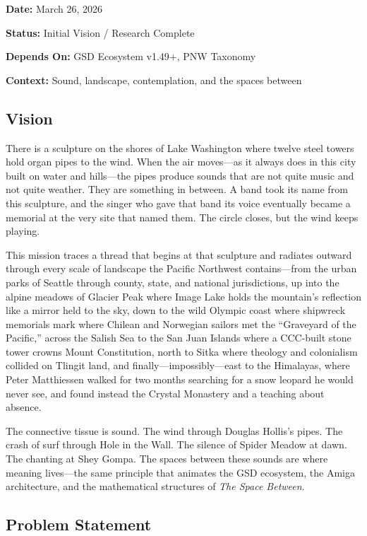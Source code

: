 \documentclass[11pt,letterpaper]{article}
\newcommand{\metafield}[2]{\textbf{\sffamily #1} #2\par}
\begin{document}
\metafield{Date:}{March 26, 2026}
\metafield{Status:}{Initial Vision / Research Complete}
\metafield{Depends On:}{GSD Ecosystem v1.49+, PNW Taxonomy}
\metafield{Context:}{Sound, landscape, contemplation, and the spaces between}

\subsection{Vision}

There is a sculpture on the shores of Lake Washington where twelve steel towers hold organ pipes to the wind. When the air moves---as it always does in this city built on water and hills---the pipes produce sounds that are not quite music and not quite weather. They are something in between. A band took its name from this sculpture, and the singer who gave that band its voice eventually became a memorial at the very site that named them. The circle closes, but the wind keeps playing.

This mission traces a thread that begins at that sculpture and radiates outward through every scale of landscape the Pacific Northwest contains---from the urban parks of Seattle through county, state, and national jurisdictions, up into the alpine meadows of Glacier Peak where Image Lake holds the mountain's reflection like a mirror held to the sky, down to the wild Olympic coast where shipwreck memorials mark where Chilean and Norwegian sailors met the ``Graveyard of the Pacific,'' across the Salish Sea to the San Juan Islands where a CCC-built stone tower crowns Mount Constitution, north to Sitka where theology and colonialism collided on Tlingit land, and finally---impossibly---east to the Himalayas, where Peter Matthiessen walked for two months searching for a snow leopard he would never see, and found instead the Crystal Monastery and a teaching about absence.

The connective tissue is sound. The wind through Douglas Hollis's pipes. The crash of surf through Hole in the Wall. The silence of Spider Meadow at dawn. The chanting at Shey Gompa. The spaces between these sounds are where meaning lives---the same principle that animates the GSD ecosystem, the Amiga architecture, and the mathematical structures of \textit{The Space Between}.

\subsection{Problem Statement}
\end{document}
